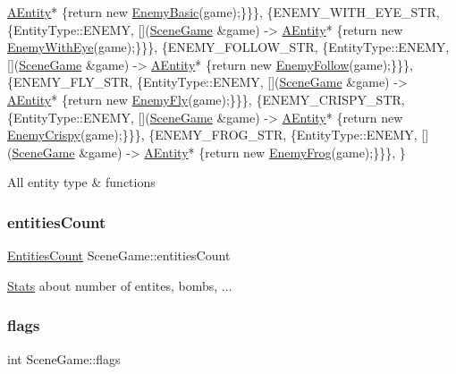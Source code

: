 \begin{DoxyCode}
      \hyperlink{class_a_entity}{AEntity}* \{\textcolor{keywordflow}{return} \textcolor{keyword}{new} \hyperlink{class_enemy_basic}{EnemyBasic}(game);\}\}\},
    \{ENEMY\_WITH\_EYE\_STR, \{EntityType::ENEMY, [](\hyperlink{class_scene_game}{SceneGame} &game) -> 
      \hyperlink{class_a_entity}{AEntity}* \{\textcolor{keywordflow}{return} \textcolor{keyword}{new} \hyperlink{class_enemy_with_eye}{EnemyWithEye}(game);\}\}\},
    \{ENEMY\_FOLLOW\_STR, \{EntityType::ENEMY, [](\hyperlink{class_scene_game}{SceneGame} &game) -> 
      \hyperlink{class_a_entity}{AEntity}* \{\textcolor{keywordflow}{return} \textcolor{keyword}{new} \hyperlink{class_enemy_follow}{EnemyFollow}(game);\}\}\},
    \{ENEMY\_FLY\_STR, \{EntityType::ENEMY, [](\hyperlink{class_scene_game}{SceneGame} &game) -> \hyperlink{class_a_entity}{AEntity}* \{\textcolor{keywordflow}{return} \textcolor{keyword}{new} 
      \hyperlink{class_enemy_fly}{EnemyFly}(game);\}\}\},
    \{ENEMY\_CRISPY\_STR, \{EntityType::ENEMY, [](\hyperlink{class_scene_game}{SceneGame} &game) -> 
      \hyperlink{class_a_entity}{AEntity}* \{\textcolor{keywordflow}{return} \textcolor{keyword}{new} \hyperlink{class_enemy_crispy}{EnemyCrispy}(game);\}\}\},
    \{ENEMY\_FROG\_STR, \{EntityType::ENEMY, [](\hyperlink{class_scene_game}{SceneGame} &game) -> \hyperlink{class_a_entity}{AEntity}* \{\textcolor{keywordflow}{return} \textcolor{keyword}{new} 
      \hyperlink{class_enemy_frog}{EnemyFrog}(game);\}\}\},
\}
\end{DoxyCode}
All entity type \& functions \mbox{\label{class_scene_game_a8cc1f105984982e09ee8c3ef7d4bf20d}} 
\subsubsection{\texorpdfstring{entities\+Count}{entitiesCount}}
{\footnotesize\ttfamily \hyperlink{struct_scene_game_1_1_entities_count}{Entities\+Count} Scene\+Game\+::entities\+Count}

\hyperlink{class_stats}{Stats} about number of entites, bombs, ... \mbox{\label{class_scene_game_a53d7732b5968cc22b938451d371592c9}} 
\subsubsection{\texorpdfstring{flags}{flags}}
{\footnotesize\ttfamily int Scene\+Game\+::flags}


